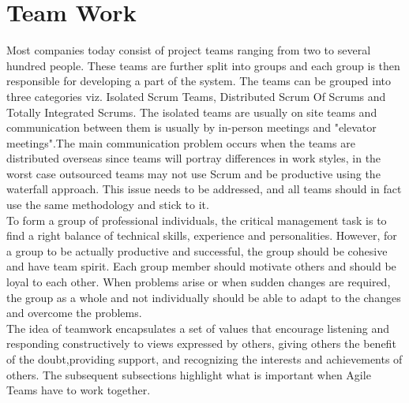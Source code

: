 \documentclass[sigplan,screen]{acmart}
\begin{document}
\section{Team Work}
Most companies today consist of project teams ranging from two to several hundred people. These teams are further split into groups and each group is then responsible for developing a part of the system. The teams can be grouped into three categories viz. Isolated Scrum Teams, Distributed Scrum Of Scrums and Totally Integrated Scrums\cite{Jeff}. The isolated teams are usually on site teams and communication between them is usually by in-person meetings and "elevator meetings".The main communication problem occurs when the teams are distributed overseas since teams will portray differences in work styles, in the worst case outsourced teams may not use Scrum and be productive using the waterfall approach. This issue needs to be addressed, and all teams should in fact use the same methodology and stick to it.\\
To form a group of professional individuals, the critical management task is to find a right balance of technical skills, experience and personalities. However, for a group to be actually productive and successful, the group should be cohesive and have team spirit\cite{ian}. Each group member should motivate others and should be loyal to each other. When problems arise or when sudden changes are required, the group as a whole and not individually should be able to adapt to the changes and overcome the problems.\\
The idea of teamwork encapsulates a set of values that encourage listening and responding constructively to views expressed by others, giving others the benefit of the doubt,providing support, and recognizing the interests and achievements of others\cite{Moe}.
The subsequent subsections highlight what is important when Agile Teams have to work together. 
\end{document}
